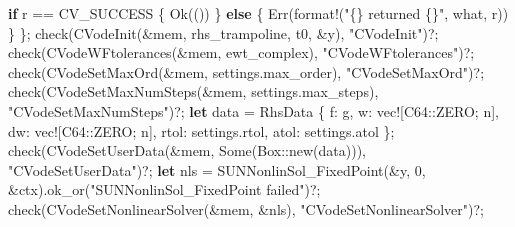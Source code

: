 \documentclass[
  10pt,
]{article}
\newenvironment{Shaded}{}{}
\newcommand{\ConstantTok}[1]{\textcolor[rgb]{0.53,0.00,0.00}{#1}}
\newcommand{\ControlFlowTok}[1]{\textcolor[rgb]{0.00,0.44,0.13}{\textbf{#1}}}
\newcommand{\DataTypeTok}[1]{\textcolor[rgb]{0.56,0.13,0.00}{#1}}
\newcommand{\DecValTok}[1]{\textcolor[rgb]{0.25,0.63,0.44}{#1}}
\newcommand{\KeywordTok}[1]{\textcolor[rgb]{0.00,0.44,0.13}{\textbf{#1}}}
\newcommand{\NormalTok}[1]{#1}
\newcommand{\OperatorTok}[1]{\textcolor[rgb]{0.40,0.40,0.40}{#1}}
\newcommand{\PreprocessorTok}[1]{\textcolor[rgb]{0.74,0.48,0.00}{#1}}
\newcommand{\StringTok}[1]{\textcolor[rgb]{0.25,0.44,0.63}{#1}}
\begin{document}
\begin{Shaded}
\begin{Highlighting}[]
        \ControlFlowTok{if}\NormalTok{ r }\OperatorTok{==}\NormalTok{ CV\_SUCCESS }\OperatorTok{\{}
            \ConstantTok{Ok}\NormalTok{(())}
        \OperatorTok{\}} \ControlFlowTok{else} \OperatorTok{\{}
            \ConstantTok{Err}\NormalTok{(}\PreprocessorTok{format!}\NormalTok{(}\StringTok{"\{\} returned \{\}"}\OperatorTok{,}\NormalTok{ what}\OperatorTok{,}\NormalTok{ r))}
        \OperatorTok{\}}
    \OperatorTok{\};}
\NormalTok{    check(CVodeInit(}\OperatorTok{\&}\NormalTok{mem}\OperatorTok{,}\NormalTok{ rhs\_trampoline}\OperatorTok{,}\NormalTok{ t0}\OperatorTok{,} \OperatorTok{\&}\NormalTok{y)}\OperatorTok{,} \StringTok{"CVodeInit"}\NormalTok{)}\OperatorTok{?;}
\NormalTok{    check(CVodeWFtolerances(}\OperatorTok{\&}\NormalTok{mem}\OperatorTok{,}\NormalTok{ ewt\_complex)}\OperatorTok{,} \StringTok{"CVodeWFtolerances"}\NormalTok{)}\OperatorTok{?;}
\NormalTok{    check(CVodeSetMaxOrd(}\OperatorTok{\&}\NormalTok{mem}\OperatorTok{,}\NormalTok{ settings}\OperatorTok{.}\NormalTok{max\_order)}\OperatorTok{,} \StringTok{"CVodeSetMaxOrd"}\NormalTok{)}\OperatorTok{?;}
\NormalTok{    check(CVodeSetMaxNumSteps(}\OperatorTok{\&}\NormalTok{mem}\OperatorTok{,}\NormalTok{ settings}\OperatorTok{.}\NormalTok{max\_steps)}\OperatorTok{,} \StringTok{"CVodeSetMaxNumSteps"}\NormalTok{)}\OperatorTok{?;}
    \KeywordTok{let}\NormalTok{ data }\OperatorTok{=}\NormalTok{ RhsData }\OperatorTok{\{}\NormalTok{ f}\OperatorTok{:}\NormalTok{ g}\OperatorTok{,}\NormalTok{ w}\OperatorTok{:} \PreprocessorTok{vec!}\NormalTok{[}\PreprocessorTok{C64::}\NormalTok{ZERO}\OperatorTok{;}\NormalTok{ n]}\OperatorTok{,}\NormalTok{ dw}\OperatorTok{:} \PreprocessorTok{vec!}\NormalTok{[}\PreprocessorTok{C64::}\NormalTok{ZERO}\OperatorTok{;}\NormalTok{ n]}\OperatorTok{,}\NormalTok{ rtol}\OperatorTok{:}\NormalTok{ settings}\OperatorTok{.}\NormalTok{rtol}\OperatorTok{,}\NormalTok{ atol}\OperatorTok{:}\NormalTok{ settings}\OperatorTok{.}\NormalTok{atol }\OperatorTok{\};}
\NormalTok{    check(CVodeSetUserData(}\OperatorTok{\&}\NormalTok{mem}\OperatorTok{,} \ConstantTok{Some}\NormalTok{(}\DataTypeTok{Box}\PreprocessorTok{::}\NormalTok{new(data)))}\OperatorTok{,} \StringTok{"CVodeSetUserData"}\NormalTok{)}\OperatorTok{?;}
    \KeywordTok{let}\NormalTok{ nls }\OperatorTok{=}\NormalTok{ SUNNonlinSol\_FixedPoint(}\OperatorTok{\&}\NormalTok{y}\OperatorTok{,} \DecValTok{0}\OperatorTok{,} \OperatorTok{\&}\NormalTok{ctx)}\OperatorTok{.}\NormalTok{ok\_or(}\StringTok{"SUNNonlinSol\_FixedPoint failed"}\NormalTok{)}\OperatorTok{?;}
\NormalTok{    check(CVodeSetNonlinearSolver(}\OperatorTok{\&}\NormalTok{mem}\OperatorTok{,} \OperatorTok{\&}\NormalTok{nls)}\OperatorTok{,} \StringTok{"CVodeSetNonlinearSolver"}\NormalTok{)}\OperatorTok{?;}

\end{Highlighting}
\end{Shaded}
\end{document}
